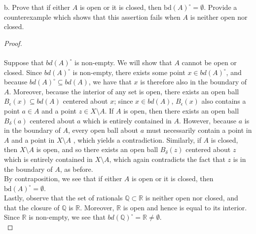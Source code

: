 \pagebreak

b. Prove that if either $A$ is open or it is closed, then $\text{bd}(A)^{\circ} = \emptyset$. Provide a counterexample
   which shows that this assertion fails when $A$ is neither open nor closed. \ \\
    
\begin{proof}\ \\\\
    Suppose that $bd(A)^{\circ}$ is non-empty. We will show that $A$ cannot be open or closed. Since $bd(A)^{\circ}$ is 
    non-empty, there exists some point $x \in bd(A)^{\circ}$, and because $bd(A)^{\circ} \subseteq bd(A)$, we have that
    $x$ is therefore also in the boundary of $A$. Moreover, because the interior of any set is open, there exists an 
    open ball $B_{\epsilon}(x) \subseteq bd(A)$ centered about $x$; since $x \in bd(A)$, $B_{\epsilon}(x)$ also 
    contains a point $a \in A$ and a point $z \in X \setminus A$. If $A$ is open, then there exists an open ball 
    $B_{\delta}(a)$ centered about $a$ which is entirely contained in $A$. However, because $a$ is in the boundary of 
    $A$, every open ball about $a$ must necessarily contain a point in $A$ and a point in $X \setminus A$ , which 
    yields a contradiction. Similarly, if $A$ is closed, then $X \setminus A$ is open, and so there exists an open ball
    $B_{\delta}(z)$ centered about $z$ which is entirely contained in $X \setminus A$, which again contradicts the fact 
    that $z$ is in the boundary of $A$, as before. \\

    By contraposition, we see that if either $A$ is open or it is closed, then $\text{bd}(A)^{\circ} = \emptyset$. \\

    Lastly, observe that the set of rationals $\mathbb{Q} \subset \mathbb{R}$ is neither open nor closed, and that the
    closure of $\mathbb{Q}$ is $\mathbb{R}$. Moreover, $\mathbb{R}$ is open and hence is equal to its interior. Since
    $\mathbb{R}$ is non-empty, we see that $bd(\mathbb{Q})^{\circ} = \mathbb{R} \neq \emptyset$.
    \ \\
\end{proof}

\pagebreak